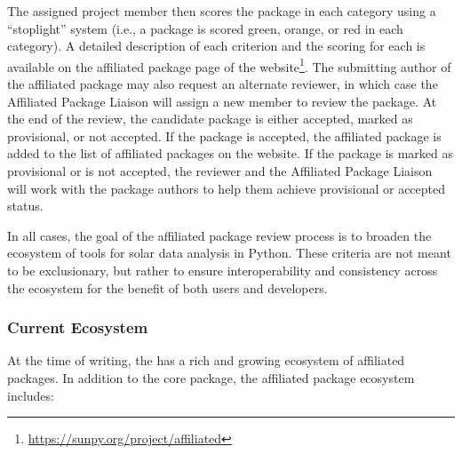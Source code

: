 The assigned project member then scores the package in each category using a \enquote{stoplight} system (i.e., a package is scored green, orange, or red in each category).
A detailed description of each criterion and the scoring for each is available on the affiliated package page of the \sunpyproj website\footnote{\url{https://sunpy.org/project/affiliated}}.
The submitting author of the affiliated package may also request an alternate reviewer, in which case the Affiliated Package Liaison will assign a new \sunpyproj member to review the package.
At the end of the review, the candidate package is either accepted, marked as provisional, or not accepted.
If the package is accepted, the affiliated package is added to the list of affiliated packages on the \sunpyproj website.
If the package is marked as provisional or is not accepted, the reviewer and the Affiliated Package Liaison will work with the package authors to help them achieve provisional or accepted status.

In all cases, the goal of the affiliated package review process is to broaden the ecosystem of tools for solar data analysis in Python.
These criteria are not meant to be exclusionary, but rather to ensure interoperability and consistency across the ecosystem for the benefit of both users and developers.

\subsubsection{Current Ecosystem}
\label{sssec:current-ecosystem}

At the time of writing, the \sunpyproj has a rich and growing ecosystem of affiliated packages.
In addition to the \sunpypkg core package, the affiliated package ecosystem includes:

